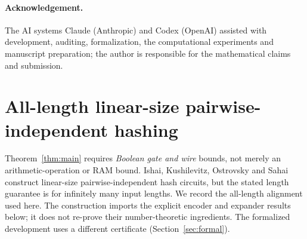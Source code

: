 \documentclass[11pt]{article}
\theoremstyle{remark}
\begin{document}
\paragraph{Acknowledgement.}
The AI systems Claude (Anthropic) and Codex (OpenAI) assisted with
development, auditing, formalization, the computational experiments and
manuscript preparation; the author is responsible for the mathematical
claims and submission.

\appendix
\section{All-length linear-size pairwise-independent hashing}
\label{app:hash}

Theorem~\ref{thm:main} requires \emph{Boolean gate and wire} bounds,
not merely an arithmetic-operation or RAM bound.
Ishai, Kushilevitz, Ostrovsky and Sahai~\cite[Theorems 3.2--3.3]{ikos2008}
construct linear-size pairwise-independent hash circuits, but the stated
length guarantee is for infinitely many input lengths. We record the
all-length alignment used here. The construction imports the explicit
encoder and expander results below; it does not re-prove their
number-theoretic ingredients. The formalized development uses a
different certificate (Section~\ref{sec:formal}).
\end{document}
